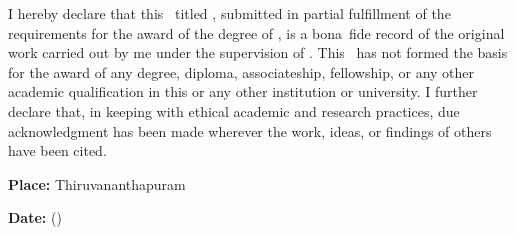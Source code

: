 I hereby declare that this \Doctype\ titled \textbf{\textit{\Title}},
submitted in partial fulfillment of the requirements for the award of
the degree of {\bf\Degreetext}, is a bona~fide record of the original work
carried out by me under the supervision of {\bf\Advisor}. This
\Doctype\ has not formed the basis for the award of any degree,
diploma, associateship, fellowship, or any other academic
qualification in this or any other institution or university. I
further declare that, in keeping with ethical academic and research
practices, due acknowledgment has been made wherever the work, ideas,
or findings of others have been cited.

\vspace{15mm}

\noindent\textbf{Place: }Thiruvananthapuram\hfill \Author \hspace{5mm}

\noindent\textbf{Date: }\Date \hfill (\Studentid)\hspace{3mm}
